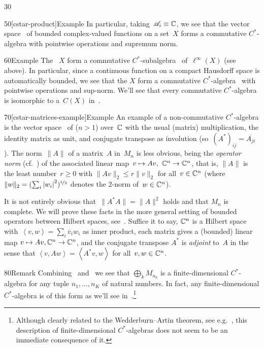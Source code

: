 \begin{parsec}{30}
\begin{point}{50}[cstar-product]{Example}
In particular,
taking~$\mathscr{A}_i\equiv \mathbb{C}$,
we see that
the vector space~%
%
of bounded complex-valued functions
on a set~$X$ forms a commutative $C^*$-algebra
with pointwise operations and supremum norm.
\end{point}
\begin{point}{60}{Example}%
The ~$X$
form a commutative $C^*$-subalgebra~%
of~$\ell^\infty(X)$ (see above).
In particular,
since a continuous function on a compact Hausdorff space is 
automatically bounded,
we see that the  $X$
form a commutative $C^*$-algebra~%
%
with pointwise operations and sup-norm.
We'll see that every commutative $C^*$-algebra
is isomorphic to a~$C(X)$
in~.
\end{point}
\begin{point}{70}[cstar-matrices-example]{Example}%
An example of a non-commutative
$C^*$-algebra
is
the vector space~%
of  ($n>1$) over~$\mathbb{C}$
with the usual (matrix) multiplication,
the identity matrix as unit,
and conjugate transpose
as involution
(so~$(A^*)_{ij} = \overline{A_{ji}}$).
The norm~$\|A\|$ of a matrix~$A$ in~$M_n$
is less obvious,
being
the \emph{operator norm}
(cf.~)
of the associated linear map~$v\mapsto Av,\ \C^n\to\C^n$,
that is,
$\|A\|$ is
the least number~$r\geq 0$
with $\|Av\|_2\leq r\|v\|_2$
for all~$v\in \mathbb{C}^n$
(where $\|w\|_2=(\sum_i \left|w_i\right|^2)^{\nicefrac{1}{2}}$
denotes the $2$-norm
of~$w\in \mathbb{C}^n$).

It is not entirely obvious that~$\|A^*A\|=\|A\|^2$
holds
and that $M_n$ is complete.
We will prove these facts in the more general setting
of bounded operators between Hilbert spaces, 
see~.
Suffice it to say, $\mathbb{C}^n$ is a Hilbert space
with~$\left<v,w\right>=\sum_i \overline{v}_iw_i$
as inner product,
each matrix gives a (bounded) linear map $v\mapsto Av,\mathbb{C}^n\to \mathbb{C}^n$,
and the conjugate transpose $A^*$ is \emph{adjoint} to~$A$
in the sense that $\left<v,Aw\right> = \left<A^*v,w\right>$
for all~$v,w\in\mathbb{C}^n$.
\end{point}
\begin{point}{80}{Remark}%
Combining~
and~
we see that
$\bigoplus_k M_{n_k}$
is a finite-dimensional
$C^*$-algebra
for any tuple $n_1,\dotsc,n_K$
of natural numbers.
In fact,
any finite-dimensional $C^*$-algebra
is of this form
as we'll see in~.\footnote{Although
clearly related to the 
Wedderburn--Artin theorem,
see e.g.~\cite{nicholson1993},
this description of finite-dimensional
$C^*$-algebras
does not seem to be an immediate consequence of it.}
\end{point}
\end{parsec}
